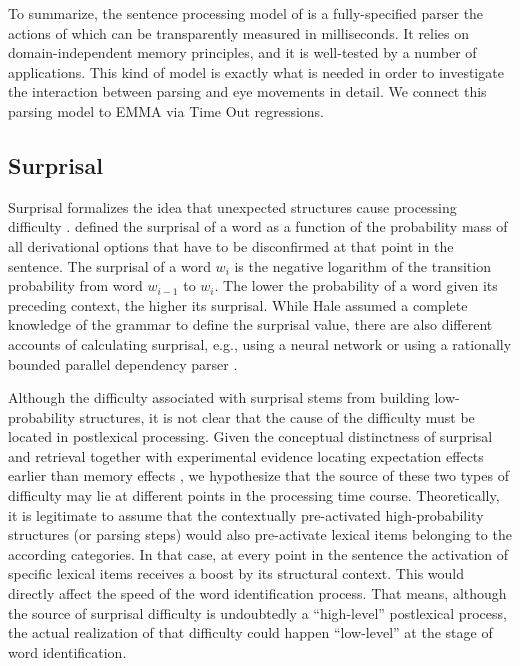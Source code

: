 To summarize, the sentence processing model of \cite{LewisVasishth2005} is a fully-specified parser the actions of which can be transparently measured in milliseconds. It relies on domain-independent memory principles,  and it is well-tested by a number of applications.  This kind of model is exactly what is needed in order to investigate the interaction between parsing and eye movements in detail. We connect this parsing model to EMMA via Time Out regressions. 


\subsection{Surprisal}
Surprisal \citep{Hale2001,Levy2008} formalizes the idea that unexpected structures cause processing difficulty \citep{Konieczny2000}. \cite{Hale2001} defined the surprisal of a word as a function of the probability mass of all derivational options that have to be disconfirmed at that point in the sentence.
The surprisal of a word $w_i$ is the negative logarithm of the transition probability from word $w_{i-1}$ to $w_i$. The lower the probability of a word given its preceding context, the higher its surprisal. While Hale assumed a complete knowledge of the grammar to define the surprisal value, there are also different accounts of calculating surprisal, e.g., using a neural network \citep{Frank2009} or using a rationally bounded parallel dependency parser \citep{BostonHaleVasishth2011}.

Although the difficulty associated with surprisal stems from building low-probability structures, it is not clear that the cause of the difficulty must be located in postlexical processing.
Given the conceptual distinctness of surprisal and retrieval together with experimental evidence locating expectation effects earlier than memory effects \citep{Staub2010a,Vasishth2011}, we hypothesize that the source of these two types of difficulty may lie at different points in the processing time course.
Theoretically, it is legitimate to assume that the contextually pre-activated high-probability structures (or parsing steps) would also pre-activate lexical items belonging to the according categories. In that case, at every point in the sentence the activation of specific lexical items receives a boost by its structural context. This would directly affect the speed of the word identification process.
That means, although the source of surprisal difficulty is undoubtedly a ``high-level'' postlexical process, the actual realization of that difficulty could happen ``low-level'' at the stage of word identification.

